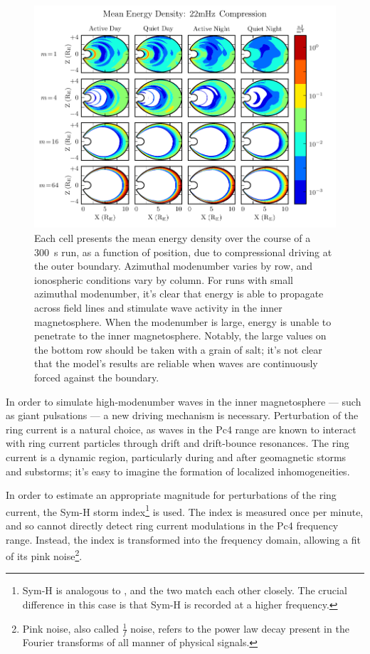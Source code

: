 \begin{figure}[!htb]
  \centering
  \includegraphics[width=\textwidth]{figures/bdrive.pdf}
  \caption[Decreasing Penetration with Increasing Modenumber]{
    Each cell presents the mean energy density over the course of a
    \SI{300}{\s} run, as a function of position, due to compressional driving
    at the outer boundary. Azimuthal modenumber varies by row, and ionospheric
    conditions vary by column. For runs with small azimuthal modenumber, it's
    clear that energy is able to propagate across field lines and stimulate
    wave activity in the inner magnetosphere. When the modenumber is large,
    energy is unable to penetrate to the inner magnetosphere. Notably, the
    large values on the bottom row should be taken with a grain of salt; it's
    not clear that the model's results are reliable when waves are continuously
    forced against the boundary. 
  }
  \label{fig_bdrive}
\end{figure}

In order to simulate high-modenumber \Alfven waves in the inner magnetosphere
--- such as giant pulsations --- a new driving mechanism is necessary.
Perturbation of the ring current is a natural choice, as \Alfven waves in the
Pc4 range are known to interact with ring current particles through drift and
drift-bounce resonances. The ring current is a dynamic region, particularly
during and after geomagnetic storms and substorms; it's easy to imagine the
formation of localized inhomogeneities. 

In order to estimate an appropriate magnitude for perturbations of the ring
current, the Sym-H storm index\footnote{Sym-H is analogous to \DST, and the two
match each other closely\cite{wanliss_2006}. The crucial difference in this
case is that Sym-H is recorded at a higher frequency. } is used. The index is
measured once per minute, and so cannot directly detect ring current
modulations in the Pc4 frequency range. Instead, the index is transformed into
the frequency domain, allowing a fit of its pink noise\footnote{Pink noise,
also called $\frac{1}{f}$ noise, refers to the power law decay present in the
Fourier transforms of all manner of physical signals. }. 

